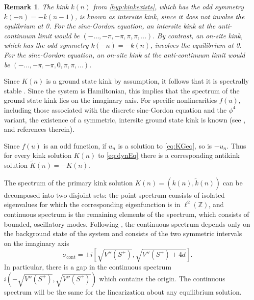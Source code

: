 \documentclass[12pt,reqno]{amsart}
\def\Z{{\mathbb Z}}
\newtheorem{remark}{Remark}
\begin{document}
\begin{remark}
The kink $k(n)$ from \cref{hyp:kinkexists}, which has the odd symmetry $k(-n) = -k(n-1)$, is known as intersite kink, since it does not involve the equlibrium at 0. For the sine-Gordon equation, an intersite kink at the anti-continuum limit would be $(-\dots, -\pi, -\pi, \pi, \pi, \dots)$. By contrast, an on-site kink, which has the odd symmetry $k(-n) = -k(n)$, involves the equilibrium at 0. For the sine-Gordon equation, an on-site kink at the anti-continuum limit would be $(-\dots, -\pi, -\pi, 0, \pi, \pi, \dots)$. 
\end{remark}

Since $K(n)$ is a ground state kink by assumption, it follows that it is spectrally stable \cite{KevrekidisWeinstein2000}. Since the system is Hamiltonian, this implies that the spectrum of the ground state kink lies on the imaginary axis. For specific nonlinearities $f(u)$, including those associated with the discrete sine-Gordon equation and the $\phi^4$ variant, the existence of a symmetric, intersite ground state kink is known 
(see \cite{KevrekidisWeinstein2000},\cite{SGchapter}  and references therein). 


Since $f(u)$ is an odd function, if $u_n$ is a solution to \cref{eq:KGeq}, so is $-u_n$. Thus for every kink solution $K(n)$ to \cref{eq:dynEq} there is a corresponding antikink solution $\tilde{K}(n) = -K(n)$.

The spectrum of the primary kink solution $K(n) = (k(n),\tilde{k}(n))$ can be decomposed into two disjoint sets: the point spectrum consists of isolated eigenvalues for which the corresponding eigenfunction is in $\ell^2(\Z)$, and continuous spectrum is the remaining elements of the spectrum, which consists of bounded, oscillatory modes. Following \cite{KevrekidisWeinstein2000}, the continuous spectrum depends only on the background state of the system and consists of the two symmetric intervals on the imaginary axis
\begin{equation}\label{eq:contspec}
	\sigma_{\text{cont}} = \pm i \left[\sqrt{V''(S^+)}, \sqrt{V''(S^+) + 4d}\right].
\end{equation}
In particular, there is a gap in the continuous spectrum $i\left(-\sqrt{V''(S^+)},\sqrt{V''(S^+)}\right)$ which contains the origin. The continuous spectrum will be the same for the linearization about any equilibrium solution. 
\end{document}
